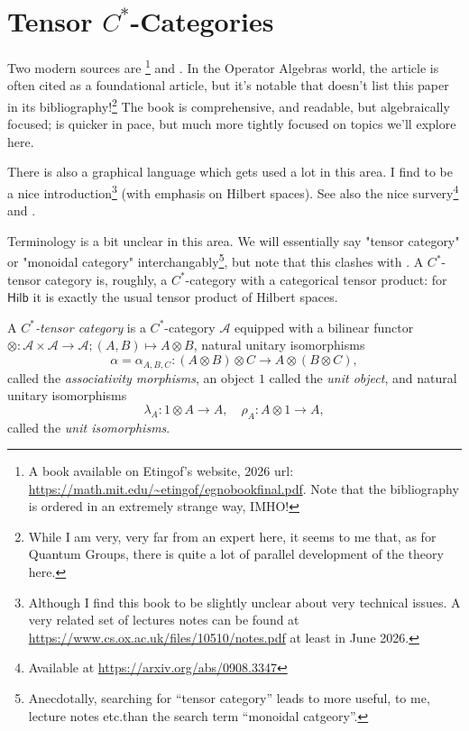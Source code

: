 \documentclass[a4paper,11pt]{article}
\theoremstyle{plain}
\theoremstyle{remark}
\newcommand{\mc}[1]{\mathcal{#1}}
\newcommand{\catHilb}{\textsf{Hilb}}
\begin{document}
\clearpage
\section{Tensor \texorpdfstring{$C^*$}{CStar}-Categories}

Two modern sources are \cite{EGNO_TensorCategories}\footnote{A book available on Etingof's website, 2026 url: \url{https://math.mit.edu/~etingof/egnobookfinal.pdf}.  Note that the bibliography is ordered in an extremely strange way, IMHO!} and \cite{NT_CQGsBook}.  In the Operator Algebras world, the article \cite{LR_Theory_dimension} is often cited as a foundational article, but it's notable that \cite{EGNO_TensorCategories} doesn't list this paper in its bibliography!\footnote{While I am very, very far from an expert here, it seems to me that, as for Quantum Groups, there is quite a lot of parallel development of the theory here.}  The book \cite{EGNO_TensorCategories} is comprehensive, and readable, but algebraically focused; \cite{NT_CQGsBook} is quicker in pace, but much more tightly focused on topics we'll explore here.

There is also a graphical language which gets used a lot in this area.  I find \cite{HV_CatsForQuantumTheory} to be a nice introduction\footnote{Although I find this book to be slightly unclear about very technical issues.  A very related set of lectures notes can be found at \url{https://www.cs.ox.ac.uk/files/10510/notes.pdf} at least in June 2026.} (with emphasis on Hilbert spaces).  See also the nice survery\footnote{Available at \url{https://arxiv.org/abs/0908.3347}} \cite{Selinger_survery_graphical} and \cite{JS_GeometryTensorCalculus}.

Terminology is a bit unclear in this area.  We will essentially say "tensor category" or "monoidal category" interchangably\footnote{Anecdotally, searching for ``tensor category'' leads to more useful, to me, lecture notes etc.\@ than the search term ``monoidal catgeory''.}, but note that this clashes with \cite{EGNO_TensorCategories}.  A $C^*$-tensor category is, roughly, a $C^*$-category with a categorical tensor product: for $\catHilb$ it is exactly the usual tensor product of Hilbert spaces.

A \emph{$C^*$-tensor category} is a $C^*$-category $\mc A$ equipped with a bilinear functor $\otimes \colon \mc A\times\mc A \to \mc A; (A,B) \mapsto A \otimes B$, natural unitary isomorphisms
\[ \alpha = \alpha_{A,B,C} \colon (A\otimes B)\otimes C \to A \otimes (B\otimes C), \]
called the \emph{associativity morphisms}, an object $1$ called the \emph{unit object}, and natural unitary isomorphisms
\[ \lambda_A \colon 1 \otimes A \to A, \quad \rho_A \colon A\otimes 1 \to A, \]
called the \emph{unit isomorphisms}.
\end{document}
